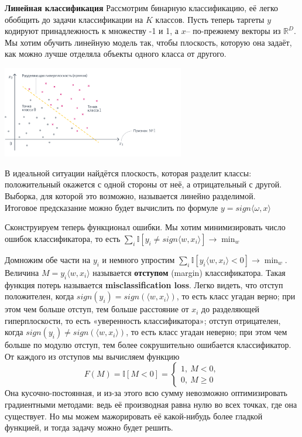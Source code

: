 \textbf{Линейная классификация} Рассмотрим бинарную классификацию, её легко обобщить до задачи классификации на $K$ классов. Пусть теперь таргеты $y$ кодируют принадлежность к множеству -1 и 1, а $x$– по-прежнему векторы из $\mathbb{R}^D$. Мы хотим обучить линейную модель так, чтобы плоскость, которую она задаёт, как можно лучше отделяла объекты одного класса от другого.
\begin{center}
    \includegraphics[height=4cm]{pics/t_osn24_3.png}
\end{center}
В идеальной ситуации найдётся плоскость, которая разделит классы: положительный окажется с одной стороны от неё, а отрицательный с другой. Выборка, для которой это возможно, называется линейно разделимой. \\
Итоговое предсказание можно будет вычислить по формуле $y = sign\langle\omega,x\rangle$

Сконструируем теперь функционал ошибки. Мы хотим минимизировать число ошибок классификатора, то есть $\sum_i \mathbb{I}[y_i \neq sign \langle w, x_i\rangle]\longrightarrow \min_w$

Домножим обе части на $y_i$ и немного упростим $\sum_i \mathbb{I}[y_i \langle w, x_i\rangle < 0]\longrightarrow \min_w$. Величина $M = y_i \langle w, x_i\rangle$ называется \textbf{отступом} (margin) классификатора. Такая функция потерь называется \textbf{misclassification loss}. Легко видеть, что отступ положителен, когда $sign(y_i) = sign(\langle w, x_i\rangle)$, то есть класс угадан верно; при этом чем больше отступ, тем больше расстояние от $x_i$ до разделяющей гиперплоскости, то есть «уверенность классификатора»; отступ отрицателен, когда $sign(y_i) \ne sign(\langle w, x_i\rangle)$, то есть класс угадан неверно; при этом чем больше по модулю отступ, тем более сокрушительно ошибается классификатор. От каждого из отступов мы вычисляем функцию $$F(M) = \mathbb{I}[M < 0] = \begin{cases}1,\ M < 0,\\ 0,\ M\geqslant 0\end{cases}$$ Она кусочно-постоянная, и из-за этого всю сумму невозможно оптимизировать градиентными методами: ведь её производная равна нулю во всех точках, где она существует. Но мы можем мажорировать её какой-нибудь более гладкой функцией, и тогда задачу можно будет решить.  \\


